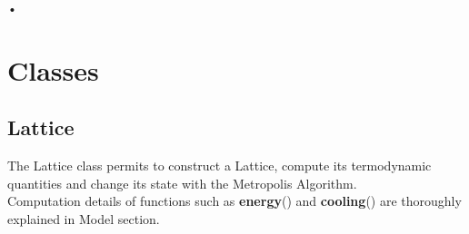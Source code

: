 
\begin{flushright}
•
\end{flushright}\section*{Classes}
	
\subsection*{Lattice}

The Lattice class permits to construct a Lattice, compute its termodynamic quantities 
and change its state with the Metropolis Algorithm. \\	  
Computation details of functions such as \textbf{energy}() and \textbf{cooling}() are thoroughly explained in Model section. \\ 

